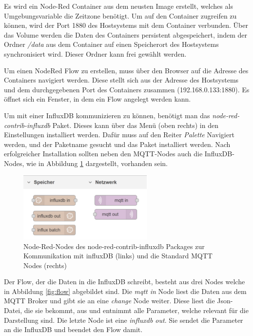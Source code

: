 \documentclass[a4paper, 12pt, oneside, toc=listofnumbered, bibliography=totoc]{scrbook}
\begin{document}
			Es wird ein Node-Red Container aus dem neusten Image erstellt, welches als Umgebungsvariable die Zeitzone benötigt. Um auf den Container zugreifen zu können, wird der Port 1880 des Hostsystems mit dem Container verbunden. Über das Volume werden die Daten des Containers persistent abgespeichert, indem der Ordner \textit{/data} aus dem Container auf einen Speicherort des Hostsystems synchronisiert wird. Dieser Ordner kann frei gewählt werden.
			
			Um einen NodeRed Flow zu erstellen, muss über den Browser auf die Adresse des Containers navigiert werden. Diese stellt sich aus der Adresse des Hostsystems und dem durchgegebenen Port des Containers zusammen (192.168.0.133:1880). Es öffnet sich ein Fenster, in dem ein Flow angelegt werden kann.
			
			Um mit einer InfluxDB kommunizieren zu können, benötigt man das \textit{node-red-contrib-influxdb} Paket. Dieses kann über das Menü (oben rechts) in den Einstellungen installiert werden. Dafür muss auf den Reiter \textit{Palette} Navigiert werden, und der Paketname gesucht und das Paket installiert werden. Nach erfolgreicher Installation sollten neben den MQTT-Nodes auch die InfluxDB-Nodes, wie in Abbildung \ref{fig:nodes} dargestellt, vorhanden sein.
			
			\begin{figure}[H]
				\centering
				\includegraphics[width=0.6\textwidth]{res/NodeRedNodes.png}
				\caption{Node-Red-Nodes des node-red-contrib-influxdb Packages zur Kommunikation mit influxDB (links) und die Standard MQTT Nodes (rechts)}
				\label{fig:nodes}
			\end{figure}
		
			Der Flow, der die Daten in die InfluxDB schreibt, besteht aus drei Nodes welche in Abbildung \ref{fig:flow} abgebildet sind. Die \textit{mqtt in} Node liest die Daten aus dem MQTT Broker und gibt sie an eine \textit{change} Node weiter. Diese liest die Json-Datei, die sie bekommt, aus und entnimmt alle Parameter, welche relevant für die Darstellung sind. Die letzte Node ist eine \textit{influxdb out}. Sie sendet die Parameter an die InfluxDB und beendet den Flow damit. 
			
\end{document}
